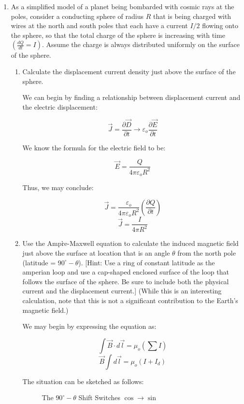 \begin{enumerate}

  \item As a simplified model of a planet being bombarded with cosmic rays at the poles, consider a conducting sphere of radius $R$ that is being charged with wires at the north and south poles that each have a current $I/2$ flowing onto the sphere, so that the total charge of the sphere is increasing with time $\left( \frac{dQ}{dt}=I \right)$.  Assume the charge is always distributed uniformly on the surface of the sphere.

    \begin{enumerate}

      \item Calculate the displacement current density just above the surface of the sphere.

    We can begin by finding a relationship between displacement current and the electric displacement:

    $$\vec{J}=\frac{\partial \vec{D}}{\partial t}\to\varepsilon_o\frac{\partial\vec{E}}{\partial t}$$

    We know the formula for the electric field to be:

    $$\vec{E}=\frac{Q}{4\pi\varepsilon_o R^2}$$

    Thus, we may conclude:

    $$\vec{J}=\frac{\varepsilon_o}{4\pi\varepsilon_o R^2}\left( \frac{\partial Q}{\partial t} \right)$$
    $$\boxed{\vec{J}=\frac{I}{4\pi R^2}}$$

      \item Use the Amp\`re-Maxwell equation to calculate the induced magnetic field just above the surface at location that is an angle $\theta$ from the north pole (latitude = $90^{\circ}-\theta$). [Hint: Use a ring of constant latitude as the amperian loop and use a cap-shaped enclosed surface of the loop that follows the surface of the sphere. Be sure to include both the physical current and the displacement current.]  (While this is an interesting calculation, note that this is not a significant contribution to the Earth’s magnetic field.)

        We may begin by expressing the equation as:

        $$\int \vec{B}\cdot d\vec{l}=\mu_o\left( \sum I \right)$$
        $$\vec{B}\int d\vec{l}=\mu_o\left( I+I_d \right)$$

        The situation can be sketched as follows:

        \begin{figure}[h]
          \centering
          
          \caption{The $90^{\circ}-\theta$ Shift Switches $\cos\to\sin$}
          \label{fig:1}
        \end{figure}


\end{enumerate}
\end{enumerate}

